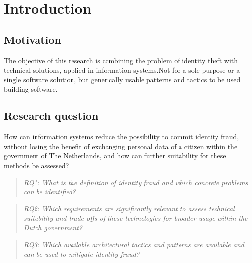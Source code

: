 \chapter{Introduction}\label{s:intro}


\section{Motivation}
The objective of this research is combining the problem of identity theft with technical solutions, applied in information systems.Not for a sole purpose or a single software solution, but generically usable patterns and tactics to be used building software.

\section{Research question}
How can information systems reduce the possibility to commit identity fraud, without losing the benefit of exchanging personal data of a citizen within the government of The Netherlands, and how can further suitability for these methods be assessed?

\begin{quote}\emph{RQ1: What is the definition of identity fraud and which concrete problems can be identified?}\end{quote}
\begin{quote}\emph{RQ2: Which requirements are significantly relevant to assess technical suitability and trade offs of these technologies for broader usage within the Dutch government?}\end{quote}
\begin{quote}\emph{RQ3: Which available architectural tactics and patterns are available and can be used to mitigate identity fraud?}\end{quote}

\break


